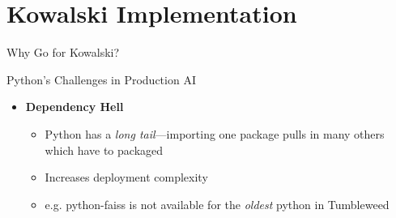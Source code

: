 \documentclass[aspectratio=169]{beamer}
\begin{document}
\section{Kowalski Implementation}
\begin{frame}{Why Go for Kowalski?}
\begin{block}{Python's Challenges in Production AI}
\begin{itemize}
    \item \textbf{Dependency Hell}  
    \begin{itemize}
        \item Python has a \textit{long tail}—importing one package pulls in many others which have to packaged 
        \item Increases deployment complexity 
        \item e.g. python-faiss is not available for the \emph{oldest} python in Tumbleweed
    \end{itemize}
\end{itemize}
\end{block}


\end{frame}
\end{document}
